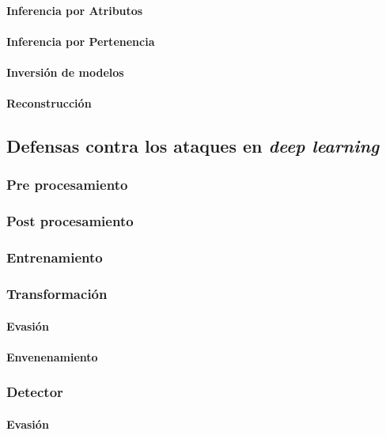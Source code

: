 \paragraph{Inferencia por Atributos}
\paragraph{Inferencia por Pertenencia}
\paragraph{Inversión de modelos}
\paragraph{Reconstrucción}


\subsection{Defensas contra los ataques en \textit{deep learning}}

\subsubsection{Pre procesamiento}
\subsubsection{Post procesamiento}
\subsubsection{Entrenamiento}
\subsubsection{Transformación}
\paragraph{Evasión}
\paragraph{Envenenamiento}
\subsubsection{Detector}
\paragraph{Evasión}
